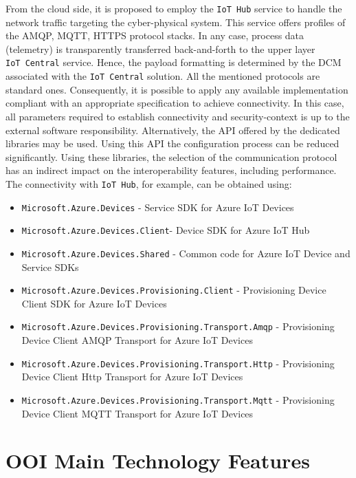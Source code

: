 \documentclass[
]{article}
\providecommand{\tightlist}{%
  \setlength{\itemsep}{0pt}\setlength{\parskip}{0pt}}
\begin{document}
From the cloud side, it is proposed to employ the \texttt{IoT\ Hub}
service to handle the network traffic targeting the cyber-physical
system. This service offers profiles of the AMQP, MQTT, HTTPS protocol
stacks. In any case, process data (telemetry) is transparently
transferred back-and-forth to the upper layer \texttt{IoT\ Central}
service. Hence, the payload formatting is determined by the DCM
associated with the \texttt{IoT\ Central} solution. All the mentioned
protocols are standard ones. Consequently, it is possible to apply any
available implementation compliant with an appropriate specification to
achieve connectivity. In this case, all parameters required to establish
connectivity and security-context is up to the external software
responsibility. Alternatively, the API offered by the dedicated
libraries may be used. Using this API the configuration process can be
reduced significantly. Using these libraries, the selection of the
communication protocol has an indirect impact on the interoperability
features, including performance. The connectivity with
\texttt{IoT\ Hub}, for example, can be obtained using:

\begin{itemize}
\tightlist
\item
  \texttt{Microsoft.Azure.Devices} - Service SDK for Azure IoT Devices
\item
  \texttt{Microsoft.Azure.Devices.Client}- Device SDK for Azure IoT Hub
\item
  \texttt{Microsoft.Azure.Devices.Shared} - Common code for Azure IoT
  Device and Service SDKs
\item
  \texttt{Microsoft.Azure.Devices.Provisioning.Client} - Provisioning
  Device Client SDK for Azure IoT Devices
\item
  \texttt{Microsoft.Azure.Devices.Provisioning.Transport.Amqp} -
  Provisioning Device Client AMQP Transport for Azure IoT Devices
\item
  \texttt{Microsoft.Azure.Devices.Provisioning.Transport.Http} -
  Provisioning Device Client Http Transport for Azure IoT Devices
\item
  \texttt{Microsoft.Azure.Devices.Provisioning.Transport.Mqtt} -
  Provisioning Device Client MQTT Transport for Azure IoT Devices
\end{itemize}

\hypertarget{ooi-main-technology-features}{%
\section{OOI Main Technology
Features}\label{ooi-main-technology-features}}
\end{document}
